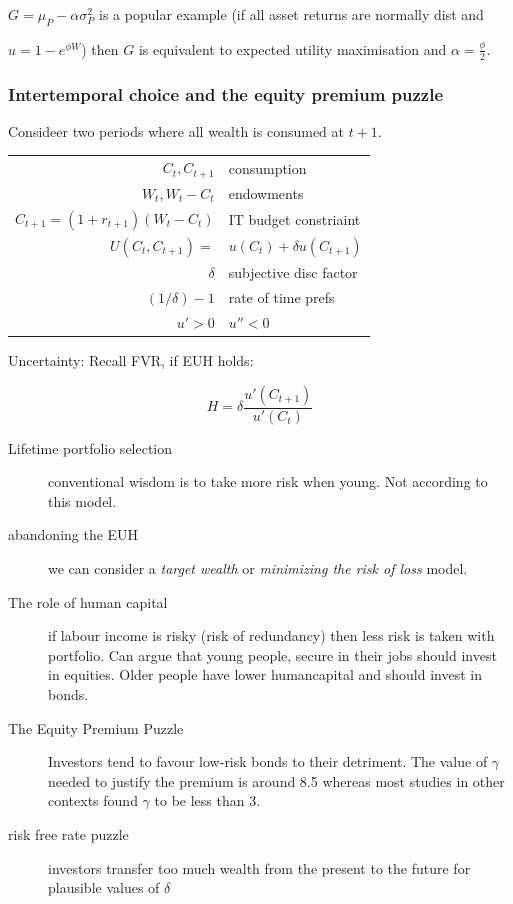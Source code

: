 \documentclass[a4paper,12pt]{article}
\begin{document}
\begin{multicols}{2}
$G=\mu_P-\alpha \sigma^2_P$ is a popular example (if all asset returns are
normally dist and 

$u=1-e^{\phi W}$) then $G$ is equivalent to expected utility maximisation and
$\alpha=\frac{\phi}{2}$. 

\subsubsection*{Intertemporal choice and the equity premium puzzle}

Consideer two periods where  all wealth is consumed at $t+1$.

\begin{tabular}{rl}
$C_t, C_{t+1}$& consumption\\
$W_t, W_t-C_t$& endowments\\
$C_{t+1}=(1+r_{t+1})(W_t-C_t)$& IT budget constriaint\\
$U(C_t,C_{t+1})=$&$u(C_t)+\delta u(C_{t+1})$\\
$\delta$& subjective disc factor\\
$(1/\delta)-1$& rate of time prefs\\
$u'>0$&$u''<0$\\
\end{tabular}

Uncertainty: Recall FVR, if EUH holds:

\[H=\delta\frac{u'(C_{t+1})}{u'(C_t)}\]
\begin{description}
\item[Lifetime portfolio selection] conventional wisdom is to take more risk
when young. Not according to this model.

\item[abandoning the EUH] we can consider a \emph{target wealth} or
\emph{minimizing the risk of loss} model.

\item[The role of human capital] if labour income is risky (risk of redundancy)
then less risk is taken with portfolio. Can argue that young people, secure in
their jobs should invest in equities. Older people have lower humancapital and
should invest in bonds.

\item[The Equity Premium Puzzle] Investors tend to favour low-risk bonds to
their detriment. The value of $\gamma$ needed to justify the premium is around
8.5 whereas most studies in other contexts found $\gamma$ to be less than 3.

\item[risk free rate puzzle] investors transfer too much wealth from the
present to the future for plausible values of $\delta$


\end{description}
\end{multicols}
\end{document}
